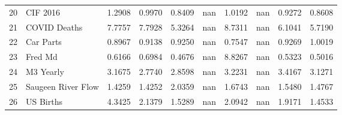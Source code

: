 \begin{tabular}{llllllllll}
20 & CIF 2016 & 1.2908 & 0.9970 & 0.8409 & nan & 1.0192 & nan & 0.9272 & 0.8608 \\
21 & COVID Deaths & 7.7757 & 7.7928 & 5.3264 & nan & 8.7311 & nan & 6.1041 & 5.7190 \\
22 & Car Parts & 0.8967 & 0.9138 & 0.9250 & nan & 0.7547 & nan & 0.9269 & 1.0019 \\
23 & Fred Md & 0.6166 & 0.6984 & 0.4676 & nan & 8.8267 & nan & 0.5323 & 0.5016 \\
24 & M3 Yearly & 3.1675 & 2.7740 & 2.8598 & nan & 3.2231 & nan & 3.4167 & 3.1271 \\
25 & Saugeen River Flow & 1.4259 & 1.4252 & 2.0359 & nan & 1.6743 & nan & 1.5480 & 1.4767 \\
26 & US Births & 4.3425 & 2.1379 & 1.5289 & nan & 2.0942 & nan & 1.9171 & 1.4533 \\
\bottomrule
\end{tabular}
